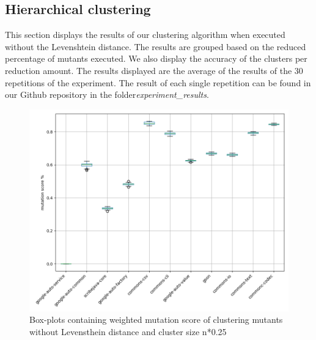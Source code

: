 \documentclass[conference,draftclsnofoot,onecolumn]{IEEEtran}
\begin{document}
\subsection{Hierarchical clustering}
This section displays the results of our clustering algorithm when executed without the Levenshtein distance.
The results are grouped based on the reduced percentage of mutants executed.
We also display the accuracy of the clusters per reduction amount.
The results displayed are the average of the results of the 30 repetitions of the experiment.
The result of each single repetition can be found in our Github repository in the folder\textit{experiment{\_}results}\cite{rbasarat-repo}.

\begin{figure}[ht]
\includegraphics[width=0.5 \textwidth]{images/boxplot_summary/boxplot_hc_no_distance_0.25.png}
\caption{\label{box:clustering_no_distance_25}Box-plots containing weighted mutation score of clustering mutants without Levensthein distance and cluster size n*0.25}
\end{figure}
\end{document}
